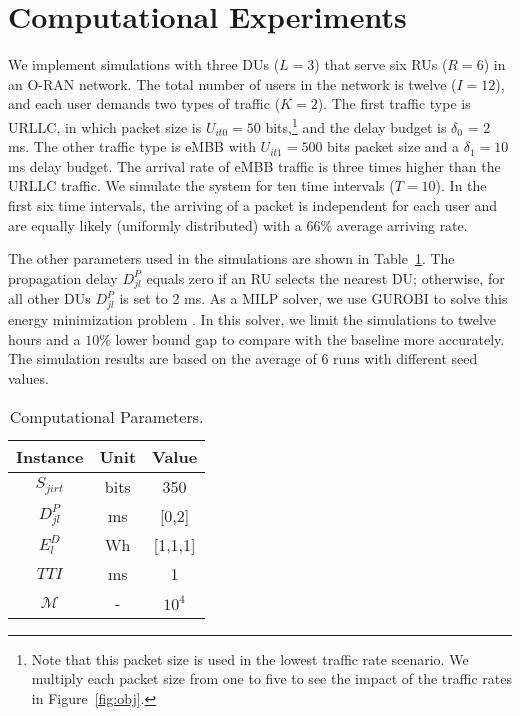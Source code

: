 \documentclass[conference]{IEEEtran}
\begin{document}
\section{Computational Experiments}
\par We implement simulations with three DUs ($L=3$) that serve six RUs ($R=6$) in an O-RAN network. The total number of users in the network is twelve ($I=12$), and each user demands two types of traffic ($K=2$). The first traffic type is URLLC, in which packet size is $U_{it0} = 50$ bits,\footnote{Note that this packet size is used in the lowest traffic rate scenario. We multiply each packet size from one to five to see the impact of the traffic rates in Figure~\ref{fig:obj}.} and the delay budget is $\delta_{0}$ = 2 ms. The other traffic type is eMBB with $U_{it1} = 500$ bits packet size and a $\delta_{1}=10$ ms delay budget. The arrival rate of eMBB traffic is three times higher than the URLLC traffic. We simulate the system for ten time intervals ($T=10$). In the first six time intervals, the arriving of a packet is independent for each user and are equally likely (uniformly distributed) with a 66\% average arriving rate.
\par The other parameters used in the simulations are shown in Table~\ref{tab:Comp}. The propagation delay $D_{jl}^P$ equals zero if an RU selects the nearest DU; otherwise, for all other DUs $D_{jl}^P$ is set to 2 ms. As a MILP solver, we use GUROBI to solve this energy minimization problem \cite{GurobiOptimization2021}. In this solver, we limit the simulations to twelve hours and a $10\%$ lower bound gap to compare with the baseline more accurately. The simulation results are based on the average of 6 runs with different seed values.
\begin{table}
\centering
\caption{\label{tab:Comp} Computational Parameters.}
\begin{tabular}{c|c|c}
Instance & Unit & Value \\ \hline
$S_{jirt}$ & bits & 350 \\
$D_{jl}^P$ & ms & [0,2] \\
$E_{l}^D$ & Wh & [1,1,1] \\
$TTI$ & ms & 1 \\
$\mathcal{M}$ & - & $10^{4}$ \\
\end{tabular}
\end{table}
\end{document}
